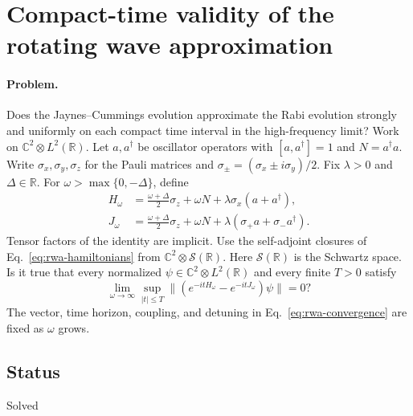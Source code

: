 \section{Compact-time validity of the rotating wave approximation}
\label{sec:op_65b01b2a5ef77a6e}

\paragraph{Problem.}
Does the Jaynes--Cummings evolution approximate the Rabi evolution strongly and uniformly on each compact time interval in the high-frequency limit?
Work on $\mathbb C^2\otimes L^2(\mathbb R)$.
Let $a,a^\dagger$ be oscillator operators with $[a,a^\dagger]=1$ and $N=a^\dagger a$.
Write $\sigma_x,\sigma_y,\sigma_z$ for the Pauli matrices and $\sigma_\pm=(\sigma_x\pm i\sigma_y)/2$.
Fix $\lambda>0$ and $\Delta\in\mathbb R$.
For $\omega>\max\{0,-\Delta\}$, define
\begin{equation}
 \begin{aligned}
 H_\omega&=\frac{\omega+\Delta}{2}\sigma_z+\omega N+
                \lambda\sigma_x(a+a^\dagger),\\
 J_\omega&=\frac{\omega+\Delta}{2}\sigma_z+\omega N+
                \lambda(\sigma_+a+\sigma_-a^\dagger).
 \end{aligned}
 \label{eq:rwa-hamiltonians}
\end{equation}
Tensor factors of the identity are implicit.
Use the self-adjoint closures of Eq.~\eqref{eq:rwa-hamiltonians} from $\mathbb C^2\otimes\mathcal S(\mathbb R)$.
Here $\mathcal S(\mathbb R)$ is the Schwartz space.
Is it true that every normalized $\psi\in\mathbb C^2\otimes L^2(\mathbb R)$ and every finite $T>0$ satisfy
\begin{equation}
 \lim_{\omega\to\infty}\sup_{|t|\leq T}
 \|(e^{-itH_\omega}-e^{-itJ_\omega})\psi\|=0?
 \label{eq:rwa-convergence}
\end{equation}
The vector, time horizon, coupling, and detuning in Eq.~\eqref{eq:rwa-convergence} are fixed as $\omega$ grows.

\subsection*{Status}

Solved

